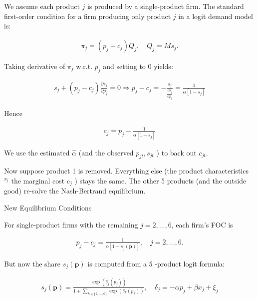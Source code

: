 

We assume each product $j$ is produced by a single-product firm. The standard first-order condition for a firm producing only product $j$ in a logit demand model is:

\begin{align*}
\pi_j=\left(p_j-c_j\right) Q_j, \quad Q_j=M s_j .
\end{align*}


Taking derivative of $\pi_j$ w.r.t. $p_j$ and setting to 0 yields:

\begin{align*}
s_j+\left(p_j-c_j\right) \frac{\partial s_j}{\partial p_j}=0 \Longrightarrow p_j-c_j=-\frac{s_j}{\frac{\partial s_j}{\partial p_j}}=\frac{1}{\alpha\left[1-s_j\right]}
\end{align*}


Hence

\begin{align*}
c_j=p_j-\frac{1}{\alpha\left[1-s_j\right]}
\end{align*}


We use the estimated $\hat{\alpha}$ (and the observed $p_{j t}, s_{j t}$ ) to back out $c_{j t}$.





Now suppose product 1 is removed. Everything else (the product characteristics ${ }^{x_j}$ the marginal cost $c_j$ ) stays the same. The other 5 products (and the outside good) re-solve the Nash-Bertrand equilibrium.

New Equilibrium Conditions

For single-product firms with the remaining $j=2, \ldots, 6$, each firm's FOC is

\begin{align*}
p_j-c_j=\frac{1}{\alpha\left[1-s_j(\mathbf{p})\right]}, \quad j=2, \ldots, 6 .
\end{align*}


But now the share $s_j(\mathbf{p})$ is computed from a 5 -product logit formula:

\begin{align*}
s_j(\mathbf{p})=\frac{\exp \left(\delta_j\left(p_j\right)\right)}{1+\sum_{k \in\{2, \ldots, 6\}} \exp \left(\delta_k\left(p_k\right)\right)}, \quad \delta_j=-\alpha p_j+\beta x_j+\xi_j
\end{align*}


